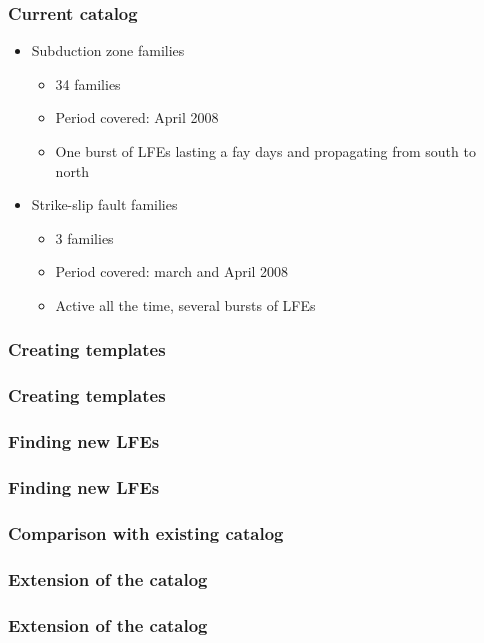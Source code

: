 \documentclass{beamer}
\begin{document}
	\begin{frame}
		\frametitle{Current catalog}
		\begin{itemize}
			\item Subduction zone families
			\begin{itemize}
				\item 34 families
				\item Period covered: April 2008
				\item One burst of LFEs lasting a fay days and propagating from south to north
			\end{itemize}
			\item Strike-slip fault families
			\begin{itemize}
				\item 3 families
				\item Period covered: march and April 2008
				\item Active all the time, several bursts of LFEs
			\end{itemize}
		\end{itemize}
	\end{frame}

	\begin{frame}
		\frametitle{Creating templates}
	\end{frame}

	\begin{frame}
		\frametitle{Creating templates}
	\end{frame}

	\begin{frame}
		\frametitle{Finding new LFEs}
	\end{frame}

	\begin{frame}
		\frametitle{Finding new LFEs}
	\end{frame}

	\begin{frame}
		\frametitle{Comparison with existing catalog}
	\end{frame}

	\begin{frame}
		\frametitle{Extension of the catalog}
	\end{frame}
	
	\begin{frame}
		\frametitle{Extension of the catalog}
	\end{frame}
\end{document}
